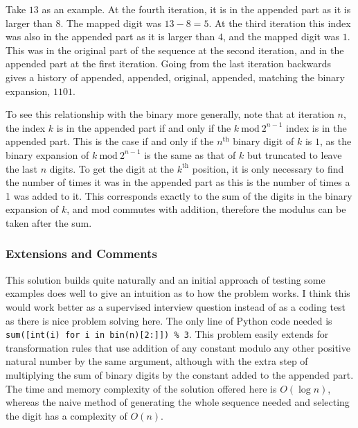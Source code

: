 Take $13$ as an example. At the fourth iteration, it is in the appended part as it is larger than $8$. The mapped digit was $13 - 8 = 5$. At the third iteration this index was also in the appended part as it is larger than $4$, and the mapped digit was $1$. This was in the original part of the sequence at the second iteration, and in the appended part at the first iteration. Going from the last iteration backwards gives a history of appended, appended, original, appended, matching the binary expansion, $1101$.

To see this relationship with the binary more generally, note that at iteration $n$, the index $k$ is in the appended part if and only if the $k \ \text{mod} \ 2^{n-1}$ index is in the appended part. This is the case if and only if the $n^\text{th}$ binary digit of $k$ is $1$, as the binary expansion of $k \ \text{mod} \ 2^{n-1}$ is the same as that of $k$ but truncated to leave the last $n$ digits. To get the digit at the $k^\text{th}$ position, it is only necessary to find the number of times it was in the appended part as this is the number of times a 1 was added to it. This corresponds exactly to the sum of the digits in the binary expansion of $k$, and $\text{mod}$ commutes with addition, therefore the modulus can be taken after the sum.

\subsubsection{Extensions and Comments}

This solution builds quite naturally and an initial approach of testing some examples does well to give an intuition as to how the problem works. I think this would work better as a supervised interview question instead of as a coding test as there is nice problem solving here. The only line of Python code needed is \texttt{sum([int(i) for i in bin(n)[2:]]) \% 3}. This problem easily extends for transformation rules that use addition of any constant modulo any other positive natural number by the same argument, although with the extra step of multiplying the sum of binary digits by the constant added to the appended part. The time and memory complexity of the solution offered here is $O(\log n)$, whereas the naive method of generating the whole sequence needed and selecting the digit has a complexity of $O(n)$.